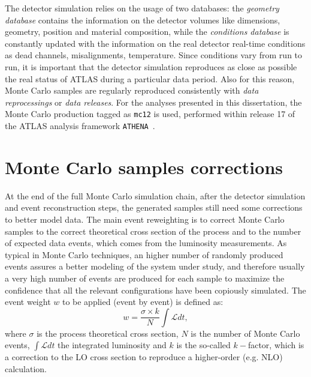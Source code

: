 

The detector simulation relies on the usage of two databases: the 
{\it geometry database} contains the information on the detector volumes
like dimensions, geometry, position and material composition, while
the {\it conditions database} is constantly updated with the information
on the real detector real-time conditions as dead channels, misalignments,
temperature. Since conditions vary from run to run, it is important that
the detector simulation reproduces as close as possible the real status
of ATLAS during a particular data period. Also for this reason, Monte
Carlo samples are regularly reproduced consistently with {\it data reprocessings}
or {\it data releases}.  For the analyses presented in this dissertation,
the Monte Carlo production tagged as \texttt{mc12} is used, performed
within release 17 of the ATLAS analysis framework \texttt{ATHENA}~\cite{Calafiura:2005zz}.



\section{Monte Carlo samples corrections}\label{sec:mcweights}

At the end of the full Monte Carlo simulation chain, after the detector simulation
and event reconstruction steps, the generated samples still need some corrections to
better model data. The main event reweighting is to correct Monte Carlo samples to
the correct theoretical cross section of the process and to the number of expected
data events, which comes from the luminosity measurements. As typical in Monte
Carlo techniques, an higher number of randomly produced events assures a better modeling
of the system under study, and therefore usually a very high number of events are
produced for each sample to maximize the confidence that all the relevant configurations
have been copiously simulated. The event weight $w$ to be applied (event by event) is defined
as:
\begin{equation}\label{eq:mcweight}
w = \dfrac{\sigma\times k}{N}\int \mathcal L dt,
\end{equation}
where $\sigma$ is the process theoretical cross section, $N$ is the number of Monte
Carlo events, $\int \mathcal L dt$ the integrated luminosity and $k$ is the so-called
$k-$factor, which is a correction to 
the LO cross section to reproduce a higher-order
(e.g. NLO) calculation.


